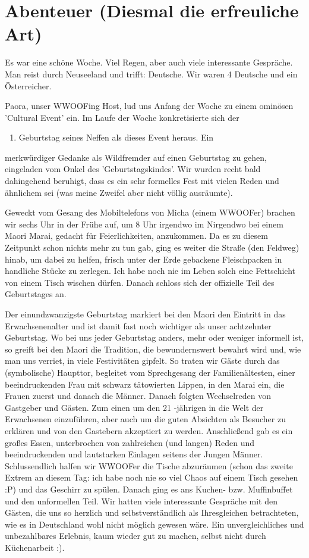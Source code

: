 \chapter{Abenteuer (Diesmal die erfreuliche Art)}

Es war eine schöne Woche. Viel Regen, aber auch viele interessante
Gespräche. Man reist durch Neuseeland und trifft: Deutsche. Wir waren 4
Deutsche und ein Österreicher.

Paora, unser WWOOFing Host, lud uns Anfang der Woche zu einem ominösen
'Cultural Event' ein. Im Laufe der Woche konkretisierte sich der

\begin{enumerate}
\tightlist
\item
  Geburtstag seines Neffen als dieses Event heraus. Ein
\end{enumerate}

merkwürdiger Gedanke als Wildfremder auf einen Geburtstag zu gehen,
eingeladen vom Onkel des 'Geburtstagskindes'. Wir wurden recht bald
dahingehend beruhigt, dass es ein sehr formelles Fest mit vielen Reden
und ähnlichem sei (was meine Zweifel aber nicht völlig ausräumte).

Geweckt vom Gesang des Mobiltelefons von Micha (einem WWOOFer) brachen
wir sechs Uhr in der Frühe auf, um 8 Uhr irgendwo im Nirgendwo bei einem
Maori Marai, gedacht für Feierlichkeiten, anzukommen. Da es zu diesem
Zeitpunkt schon nichts mehr zu tun gab, ging es weiter die Straße (den
Feldweg) hinab, um dabei zu helfen, frisch unter der Erde gebackene
Fleischpacken in handliche Stücke zu zerlegen. Ich habe noch nie im
Leben solch eine Fettschicht von einem Tisch wischen dürfen. Danach
schloss sich der offizielle Teil des Geburtstages an.

Der einundzwanzigste Geburtstag markiert bei den Maori den Eintritt in
das Erwachsenenalter und ist damit fast noch wichtiger als unser
achtzehnter Geburtstag. Wo bei uns jeder Geburtstag anders, mehr oder
weniger informell ist, so greift bei den Maori die Tradition, die
bewundernswert bewahrt wird und, wie man uns verriet, in viele
Festivitäten gipfelt. So traten wir Gäste durch das (symbolische)
Haupttor, begleitet vom Sprechgesang der Familienältesten, einer
beeindruckenden Frau mit schwarz tätowierten Lippen, in den Marai ein,
die Frauen zuerst und danach die Männer. Danach folgten Wechselreden von
Gastgeber und Gästen. Zum einen um den 21 -jährigen in die Welt der
Erwachsenen einzuführen, aber auch um die guten Absichten als Besucher
zu erklären und von den Gastebern akzeptiert zu werden. Anschließend gab
es ein großes Essen, unterbrochen von zahlreichen (und langen) Reden und
beeindruckenden und lautstarken Einlagen seitens der Jungen Männer.
Schlussendlich halfen wir WWOOFer die Tische abzuräumen (schon das
zweite Extrem an diesem Tag: ich habe noch nie so viel Chaos auf einem
Tisch gesehen :P) und das Geschirr zu spülen. Danach ging es ans Kuchen-
bzw. Muffinbuffet und den unformellen Teil. Wir hatten viele
interessante Gespräche mit den Gästen, die uns so herzlich und
selbstverständlich als Ihresgleichen betrachteten, wie es in Deutschland
wohl nicht möglich gewesen wäre. Ein unvergleichliches und unbezahlbares
Erlebnis, kaum wieder gut zu machen, selbst nicht durch Küchenarbeit :).

